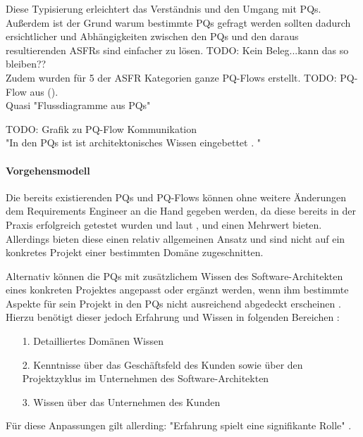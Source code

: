 Diese Typisierung erleichtert das Verständnis und den Umgang mit PQs. Außerdem ist der Grund warum bestimmte PQs gefragt werden sollten dadurch ersichtlicher und Abhängigkeiten zwischen den PQs und den daraus resultierenden ASFRs sind einfacher zu lösen.
TODO: Kein Beleg...kann das so bleiben?? \\


Zudem wurden für 5 der ASFR Kategorien ganze PQ-Flows erstellt. 
TODO: PQ-Flow aus (\cite{Ros01}). \\

Quasi "Flussdiagramme aus PQs"

TODO: Grafik zu PQ-Flow Kommunikation \\




"In den PQs ist ist architektonisches Wissen eingebettet \cite{Ros02}. "


\paragraph{Vorgehensmodell} \label{probing_model}

Die bereits existierenden PQs und PQ-Flows können ohne weitere Änderungen dem Requirements Engineer an die Hand gegeben werden, da diese bereits in der Praxis erfolgreich getestet wurden und laut \cite{Ros01}, \cite{Ros02} und \cite{Ros03} einen Mehrwert bieten. Allerdings bieten diese einen relativ allgemeinen Ansatz und sind nicht auf ein konkretes Projekt einer bestimmten Domäne zugeschnitten. 

Alternativ können die PQs mit zusätzlichem Wissen des Software-Architekten eines konkreten Projektes angepasst oder ergänzt werden, wenn ihm bestimmte Aspekte für sein Projekt in den PQs nicht ausreichend abgedeckt erscheinen \cite{Ros02}. Hierzu benötigt dieser jedoch Erfahrung und Wissen in folgenden Bereichen \cite{Ros02}: \\

\begin{itemize}
\item[1.] Detailliertes Domänen Wissen
\item[2.] Kenntnisse über das Geschäftsfeld des Kunden sowie über den Projektzyklus im Unternehmen des Software-Architekten
\item[3.] Wissen über das Unternehmen des Kunden
\end{itemize}

Für diese Anpassungen gilt allerding: "Erfahrung spielt eine signifikante Rolle" \cite{Ros02}. \\

